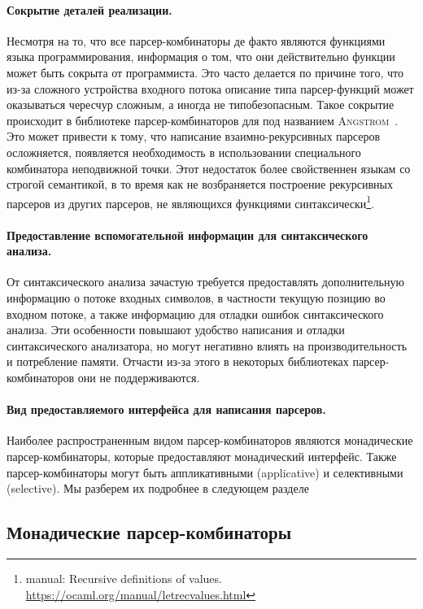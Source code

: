 \paragraph{Сокрытие деталей реализации.}
Несмотря на то, что все парсер-комбинаторы де факто являются функциями языка программирования, информация о том, что они действительно функции может быть сокрыта от программиста. Это часто делается по причине того, что из-за сложного устройства входного потока описание типа парсер-функций может оказываться чересчур сложным, а иногда не типобезопасным. Такое сокрытие происходит в библиотеке парсер-комбинаторов для \OCaml{} под названием \textsc{Angstrom}~\cite{angstrom}. Это может привести к тому, что написание взаимно-рекурсивных парсеров осложняется, появляется необходимость в использовании специального комбинатора неподвижной точки. Этот недостаток более свойственнен языкам со строгой семантикой, в то время как \Haskell{} не возбраняется построение рекурсивных парсеров из других парсеров, не являющихся функциями синтаксически\footnote{\OCaml{} manual: Recursive definitions of values. \url{https://ocaml.org/manual/letrecvalues.html}}.


\paragraph{Предоставление вспомогательной информации для синтаксического анализа.}
От синтаксического анализа зачастую требуется предоставлять дополнительную информацию о потоке входных символов, в частности текущую позицию во входном потоке, а также информацию для отладки ошибок синтаксического анализа. Эти особенности повышают удобство написания и отладки синтаксического анализатора, но могут негативно влиять на производительность и потребление памяти. Отчасти из-за этого в некоторых библиотеках парсер-комбинаторов они не поддерживаются.

\paragraph{Вид предоставляемого интерфейса для написания парсеров.}
Наиболее распространенным видом парсер-комбинаторов являются монадические парсер-комбинаторы, которые предоставляют монадический интерфейс. Также парсер-комбинаторы могут быть аппликативными (applicative) и селективными (selective). Мы разберем их подробнее в следующем разделе 


\subsection{Монадические парсер-комбинаторы}

